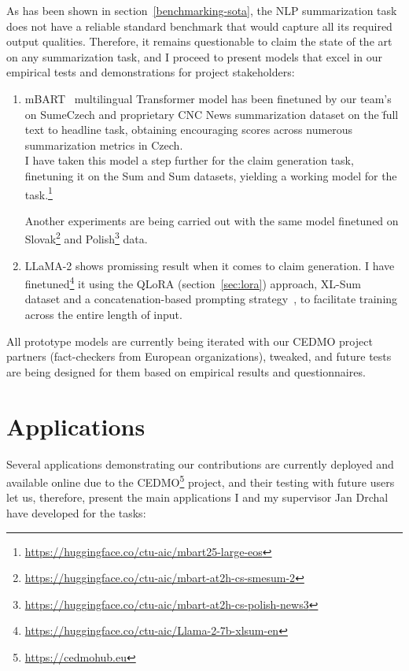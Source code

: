 As has been shown in section~\ref{benchmarking-sota}, the NLP summarization task does not have a reliable standard benchmark that would capture all its required output qualities. Therefore, it remains questionable to claim the state of the art on any summarization task, and I proceed to present models that excel in our empirical tests and demonstrations for project stakeholders:

\begin{enumerate}
    \item {\techbf mBART}~\cite{mbart} multilingual Transformer model has been finetuned by our team's~\cite{krotil} on SumeCzech and proprietary CNC News summarization dataset on the \"{full text to headline} task, obtaining encouraging scores across numerous summarization metrics in Czech.\\
    I have taken this model a step further for the claim generation task, finetuning it on the {\FCZ}Sum and {\CTK}Sum datasets, yielding a working model for the task.\footnote{
    \url{https://huggingface.co/ctu-aic/mbart25-large-eos}}

    Another experiments are being carried out with the same model finetuned on Slovak\footnote{\url{https://huggingface.co/ctu-aic/mbart-at2h-cs-smesum-2}} and Polish\footnote{\url{https://huggingface.co/ctu-aic/mbart-at2h-cs-polish-news3}} data.
    \item {\techbf LLaMA-2} shows promissing result when it comes to claim generation.
    I have finetuned\footnote{\url{https://huggingface.co/ctu-aic/Llama-2-7b-xlsum-en}} it using the QLoRA (section~\ref{sec:lora}) approach, XL-Sum~\cite{xlsum} dataset and a concatenation-based prompting strategy~\cite{llama2}, to facilitate training across the entire length of input.
    
\end{enumerate}

All prototype models are currently being iterated with our CEDMO project partners (fact-checkers from European organizations),  tweaked, and future tests are being designed for them based on empirical results and questionnaires.


\section{Applications}
\label{sec:applications}
Several applications demonstrating our contributions are currently deployed and available online due to the CEDMO\footnote{\url{https://cedmohub.eu}} project, and their testing with future users let us, therefore, present the main applications I and my supervisor Jan Drchal have developed for the tasks:

